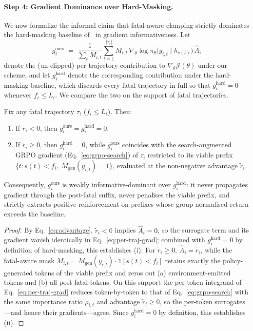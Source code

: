 \paragraph{Step 4: Gradient Dominance over Hard-Masking.}
We now formalize the informal claim that fatal-aware clamping strictly dominates the hard-masking baseline of~\citep{huang2026vision} in gradient informativeness. Let
\begin{equation}
  g_i^{\text{ours}} \;=\; \frac{1}{\sum_{t} M_{i,t}} \sum_{t=1}^{|\tau_i|} M_{i,t}\, \nabla_\theta \log \pi_\theta\!\bigl(y_{i,t} \mid h_{s(t)}\bigr)\, \hat{A}_i
  \label{eq:per-traj-grad}
\end{equation}
denote the (un-clipped) per-trajectory contribution to $\nabla_\theta \mathcal{J}(\theta)$ under our scheme, and let $g_i^{\text{hard}}$ denote the corresponding contribution under the hard-masking baseline, which discards every fatal trajectory in full so that $g_i^{\text{hard}} = 0$ whenever $f_i \le L_i$. We compare the two on the support of fatal trajectories.

\begin{proposition}
\label{prop:dominance}
Fix any fatal trajectory $\tau_i$ ($f_i \le L_i$). Then:
\begin{enumerate}[leftmargin=*,itemsep=1pt,topsep=1pt]
  \item If $\widetilde{r}_i < 0$, then $g_i^{\text{ours}} = g_i^{\text{hard}} = 0$.
  \item If $\widetilde{r}_i \ge 0$, then $g_i^{\text{hard}} = 0$, while $g_i^{\text{ours}}$ coincides with the search-augmented GRPO gradient (Eq.~\ref{eq:grpo-search}) of $\tau_i$ restricted to its viable prefix $\{t : s(t) < f_i,\; M_{\text{gen}}(y_{i,t}) = 1\}$, evaluated at the non-negative advantage $\widetilde{r}_i$.
\end{enumerate}
Consequently, $g_i^{\text{ours}}$ is weakly informative-dominant over $g_i^{\text{hard}}$: it never propagates gradient through the post-fatal suffix, never penalises the viable prefix, and strictly extracts positive reinforcement on prefixes whose group-normalised return exceeds the baseline.
\end{proposition}

\begin{proof}
By Eq.~\ref{eq:advantage}, $\widetilde{r}_i < 0$ implies $\hat{A}_i = 0$, so the surrogate term and its gradient vanish identically in Eq.~\ref{eq:per-traj-grad}; combined with $g_i^{\text{hard}} = 0$ by definition of hard-masking, this establishes (i). For $\widetilde{r}_i \ge 0$, $\hat{A}_i = \widetilde{r}_i$, while the fatal-aware mask $M_{i,t} = M_{\text{gen}}(y_{i,t}) \cdot \mathbb{1}[s(t) < f_i]$ retains exactly the policy-generated tokens of the viable prefix and zeros out (a) environment-emitted tokens and (b) all post-fatal tokens. On this support the per-token integrand of Eq.~\ref{eq:per-traj-grad} reduces token-by-token to that of Eq.~\ref{eq:grpo-search} with the same importance ratio $\rho_{i,t}$ and advantage $\widetilde{r}_i \ge 0$, so the per-token surrogates---and hence their gradients---agree. Since $g_i^{\text{hard}} = 0$ by definition, this establishes (ii).
\end{proof}

